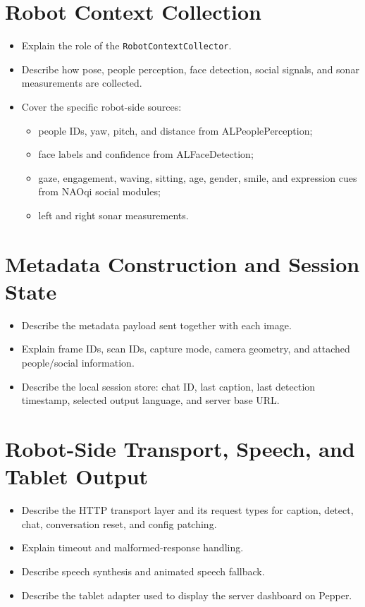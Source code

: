 \documentclass[
  digital,     %
  oneside,     %
  nosansbold,  %
  nocolorbold, %
  lof,         %
  lot,         %
]{fithesis4}
\begin{document}
\section{Robot Context Collection}
\begin{itemize}
    \item Explain the role of the \texttt{RobotContextCollector}.
    \item Describe how pose, people perception, face detection, social signals, and sonar measurements are collected.
    \item Cover the specific robot-side sources:
    \begin{itemize}
        \item people IDs, yaw, pitch, and distance from ALPeoplePerception;
        \item face labels and confidence from ALFaceDetection;
        \item gaze, engagement, waving, sitting, age, gender, smile, and expression cues from NAOqi social modules;
        \item left and right sonar measurements.
    \end{itemize}
\end{itemize}

\section{Metadata Construction and Session State}
\begin{itemize}
    \item Describe the metadata payload sent together with each image.
    \item Explain frame IDs, scan IDs, capture mode, camera geometry, and attached people/social information.
    \item Describe the local session store: chat ID, last caption, last detection timestamp, selected output language, and server base URL.
\end{itemize}

\section{Robot-Side Transport, Speech, and Tablet Output}
\begin{itemize}
    \item Describe the HTTP transport layer and its request types for caption, detect, chat, conversation reset, and config patching.
    \item Explain timeout and malformed-response handling.
    \item Describe speech synthesis and animated speech fallback.
    \item Describe the tablet adapter used to display the server dashboard on Pepper.
\end{itemize}
\end{document}
